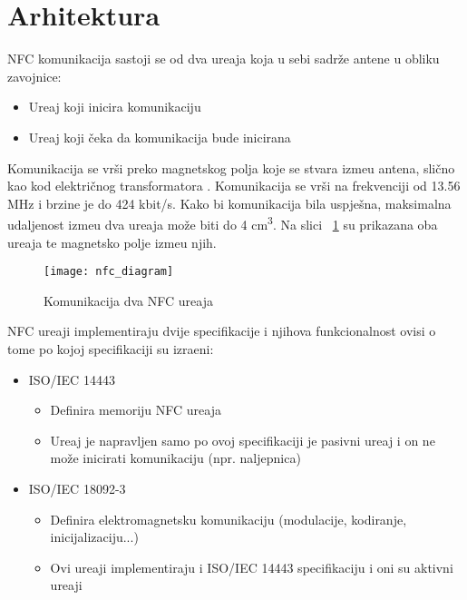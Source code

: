 \section{Arhitektura}

NFC komunikacija sastoji se od dva ure\dj aja koja u sebi sadr\v{z}e antene u obliku zavojnice:
\begin{itemize}
	\item Ure\dj aj koji inicira komunikaciju
	\item Ure\dj aj koji \v{c}eka da komunikacija bude inicirana
\end{itemize}

Komunikacija se vr\v{s}i preko magnetskog polja koje se stvara izme\dj u antena, sli\v{c}no kao kod elektri\v{c}nog transformatora \cite{nfc_techonology}. Komunikacija se vr\v{s}i na frekvenciji od 13.56 MHz i brzine je do 424 kbit/s. Kako bi komunikacija bila uspje\v{s}na, maksimalna udaljenost izme\dj u dva ure\dj aja mo\v{z}e biti do 4 cm\textsuperscript{3}. Na slici ~\ref{fig:nfc_arhitektura} su prikazana oba ure\dj aja te magnetsko polje izme\dj u njih.


\begin{figure}[!htbp]
	\begin{center}
 \texttt{[image: nfc\_diagram]}
 \caption{Komunikacija dva NFC ure\dj aja}
 \label{fig:nfc_arhitektura}
	\end{center}
\end{figure}

NFC ure\dj aji implementiraju dvije specifikacije i njihova funkcionalnost ovisi o tome po kojoj specifikaciji su izra\dj eni:

\begin{itemize}
	\item ISO/IEC 14443
	\begin{itemize}
		\item Definira memoriju NFC ure\dj aja
		\item Ure\dj aj je napravljen samo po ovoj specifikaciji je pasivni ure\dj aj i on ne mo\v{z}e inicirati komunikaciju (npr. naljepnica)
		
	\end{itemize}
	\item ISO/IEC 18092-3
	
	\begin{itemize}
		\item Definira elektromagnetsku komunikaciju (modulacije, kodiranje, inicijalizaciju...)
		\item Ovi ure\dj aji implementiraju i ISO/IEC 14443 specifikaciju i oni su aktivni ure\dj aji
	\end{itemize}
\end{itemize}

